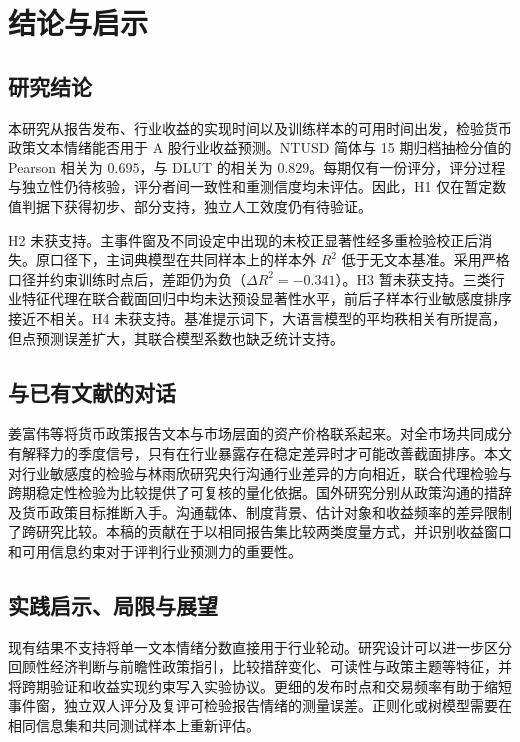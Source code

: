 \section{结论与启示}\label{sec:conclusion}

\subsection{研究结论}
本研究从报告发布、行业收益的实现时间以及训练样本的可用时间出发，检验货币政策文本情绪能否用于 A 股行业收益预测。NTUSD 简体与 15 期归档抽检分值的 Pearson 相关为 $0.695$，与 DLUT 的相关为 $0.829$。每期仅有一份评分，评分过程与独立性仍待核验，评分者间一致性和重测信度均未评估。因此，H1 仅在暂定数值判据下获得初步、部分支持，独立人工效度仍有待验证。

H2 未获支持。主事件窗及不同设定中出现的未校正显著性经多重检验校正后消失。原口径下，主词典模型在共同样本上的样本外 $R^2$ 低于无文本基准。采用严格口径并约束训练时点后，差距仍为负（$\Delta R^2=-0.341$）。H3 暂未获支持。三类行业特征代理在联合截面回归中均未达预设显著性水平，前后子样本行业敏感度排序接近不相关。H4 未获支持。基准提示词下，大语言模型的平均秩相关有所提高，但点预测误差扩大，其联合模型系数也缺乏统计支持。

\subsection{与已有文献的对话}
姜富伟等将货币政策报告文本与市场层面的资产价格联系起来\cite{jiangHuHuang2021}。对全市场共同成分有解释力的季度信号，只有在行业暴露存在稳定差异时才可能改善截面排序。本文对行业敏感度的检验与林雨欣研究央行沟通行业差异的方向相近\cite{linYuxin2025}，联合代理检验与跨期稳定性检验为比较提供了可复核的量化依据。国外研究分别从政策沟通的措辞及货币政策目标推断入手\cite{luccaTrebbi2009,shapiroWilson2022}。沟通载体、制度背景、估计对象和收益频率的差异限制了跨研究比较。本稿的贡献在于以相同报告集比较两类度量方式，并识别收益窗口和可用信息约束对于评判行业预测力的重要性。

\subsection{实践启示、局限与展望}
现有结果不支持将单一文本情绪分数直接用于行业轮动。研究设计可以进一步区分回顾性经济判断与前瞻性政策指引，比较措辞变化、可读性与政策主题等特征，并将跨期验证和收益实现约束写入实验协议。更细的发布时点和交易频率有助于缩短事件窗，独立双人评分及复评可检验报告情绪的测量误差。正则化或树模型需要在相同信息集和共同测试样本上重新评估。

